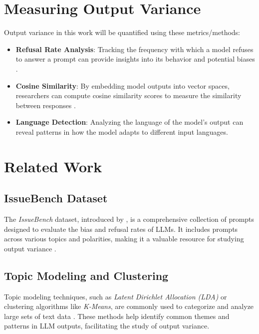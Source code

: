 \section{Measuring Output Variance}

Output variance in this work will be quantified using these metrics/methods:

\begin{itemize}
	\item \textbf{Refusal Rate Analysis}: Tracking the frequency with which a model refuses to answer a prompt can provide insights into its behavior and potential biases \autocite{garcia-ferreroRefusalSteeringFinegrained2025,panPoliticalCensorshipLarge2026}.
	\item \textbf{Cosine Similarity}: By embedding model outputs into vector spaces, researchers can compute cosine similarity scores to measure the similarity between responses \cite{sitikhuComparisonSemanticSimilarity2019}.
	\item \textbf{Language Detection}: Analyzing the language of the model's output can reveal patterns in how the model adapts to different input languages.
\end{itemize}

\section{Related Work}

\subsection{IssueBench Dataset}

The \textit{IssueBench} dataset, introduced by \citeauthor{rottgerIssueBenchMillionsRealistic2026a}, is a comprehensive collection of prompts designed to evaluate the bias and refusal rates of LLMs. It includes prompts across various topics and polarities, making it a valuable resource for studying output variance \cite{rottgerIssueBenchMillionsRealistic2026a}.

\subsection{Topic Modeling and Clustering}

Topic modeling techniques, such as \textit{Latent Dirichlet Allocation (LDA)} or clustering algorithms like \textit{K-Means}, are commonly used to categorize and analyze large sets of text data \cite{grootendorstBERTopicNeuralTopic2022a}. These methods help identify common themes and patterns in LLM outputs, facilitating the study of output variance.

